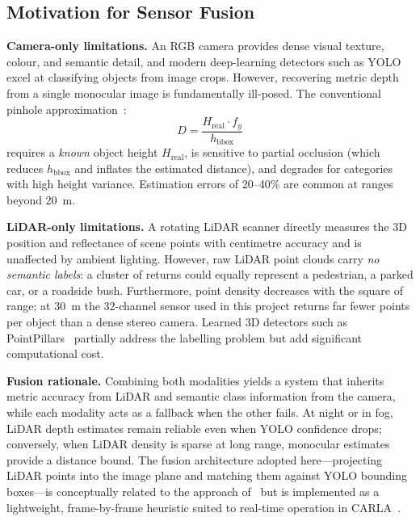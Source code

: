 \documentclass[12pt,a4paper]{article}
\begin{document}
\subsection{Motivation for Sensor Fusion}

\textbf{Camera-only limitations.}
An RGB camera provides dense visual texture, colour, and semantic detail, and
modern deep-learning detectors such as YOLO~\cite{redmon2016yolo} excel at
classifying objects from image crops.  However, recovering metric depth from a
single monocular image is fundamentally ill-posed.  The conventional pinhole
approximation~\cite{hartley2003mvg}:
\begin{equation}
  D = \frac{H_{\text{real}} \cdot f_y}{h_{\text{bbox}}}
  \label{eq:pinhole_intro}
\end{equation}
requires a \emph{known} object height $H_{\text{real}}$, is sensitive to
partial occlusion (which reduces $h_{\text{bbox}}$ and inflates the estimated
distance), and degrades for categories with high height variance.  Estimation
errors of 20--40\% are common at ranges beyond \SI{20}{\metre}.

\textbf{LiDAR-only limitations.}
A rotating LiDAR scanner directly measures the 3D position and reflectance of
scene points with centimetre accuracy and is unaffected by ambient lighting.
However, raw LiDAR point clouds carry \emph{no semantic labels}: a cluster of
returns could equally represent a pedestrian, a parked car, or a roadside bush.
Furthermore, point density decreases with the square of range; at
\SI{30}{\metre} the 32-channel sensor used in this project returns far fewer
points per object than a dense stereo camera.  Learned 3D detectors such as
PointPillars~\cite{lang2019pointpillars} partially address the labelling
problem but add significant computational cost.

\textbf{Fusion rationale.}
Combining both modalities yields a system that inherits metric accuracy from
LiDAR and semantic class information from the camera, while each modality acts
as a fallback when the other fails.  At night or in fog, LiDAR depth estimates
remain reliable even when YOLO confidence drops; conversely, when LiDAR
density is sparse at long range, monocular estimates provide a distance
bound.  The fusion architecture adopted here---projecting LiDAR points into
the image plane and matching them against YOLO bounding boxes---is
conceptually related to the approach of~\cite{chen2017mv3d} but is
implemented as a lightweight, frame-by-frame heuristic suited to real-time
operation in CARLA~\cite{dosovitskiy2017carla}.
\end{document}

